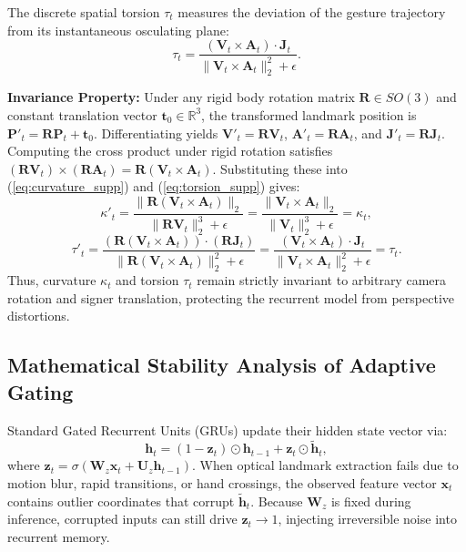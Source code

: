 \documentclass[10pt,conference]{IEEEtran}
\begin{document}
The discrete spatial torsion $\tau_t$ measures the deviation of the gesture trajectory from its instantaneous osculating plane:
\begin{equation}
\tau_t = \frac{(\mathbf{V}_t \times \mathbf{A}_t) \cdot \mathbf{J}_t}{\|\mathbf{V}_t \times \mathbf{A}_t\|_2^2 + \epsilon}.
\label{eq:torsion_supp}
\end{equation}

\textbf{Invariance Property:} Under any rigid body rotation matrix $\mathbf{R} \in SO(3)$ and constant translation vector $\mathbf{t}_0 \in \mathbb{R}^3$, the transformed landmark position is $\mathbf{P}'_t = \mathbf{R} \mathbf{P}_t + \mathbf{t}_0$. Differentiating yields $\mathbf{V}'_t = \mathbf{R} \mathbf{V}_t$, $\mathbf{A}'_t = \mathbf{R} \mathbf{A}_t$, and $\mathbf{J}'_t = \mathbf{R} \mathbf{J}_t$. Computing the cross product under rigid rotation satisfies $(\mathbf{R}\mathbf{V}_t) \times (\mathbf{R}\mathbf{A}_t) = \mathbf{R}(\mathbf{V}_t \times \mathbf{A}_t)$. Substituting these into (\ref{eq:curvature_supp}) and (\ref{eq:torsion_supp}) gives:
\begin{equation}
\kappa'_t = \frac{\|\mathbf{R}(\mathbf{V}_t \times \mathbf{A}_t)\|_2}{\|\mathbf{R}\mathbf{V}_t\|_2^3 + \epsilon} = \frac{\|\mathbf{V}_t \times \mathbf{A}_t\|_2}{\|\mathbf{V}_t\|_2^3 + \epsilon} = \kappa_t,
\end{equation}
\begin{equation}
\tau'_t = \frac{(\mathbf{R}(\mathbf{V}_t \times \mathbf{A}_t)) \cdot (\mathbf{R}\mathbf{J}_t)}{\|\mathbf{R}(\mathbf{V}_t \times \mathbf{A}_t)\|_2^2 + \epsilon} = \frac{(\mathbf{V}_t \times \mathbf{A}_t) \cdot \mathbf{J}_t}{\|\mathbf{V}_t \times \mathbf{A}_t\|_2^2 + \epsilon} = \tau_t.
\end{equation}
Thus, curvature $\kappa_t$ and torsion $\tau_t$ remain strictly invariant to arbitrary camera rotation and signer translation, protecting the recurrent model from perspective distortions.

\subsection{Mathematical Stability Analysis of Adaptive Gating}
Standard Gated Recurrent Units (GRUs) update their hidden state vector via:
\begin{equation}
\mathbf{h}_t = (1 - \mathbf{z}_t) \odot \mathbf{h}_{t-1} + \mathbf{z}_t \odot \tilde{\mathbf{h}}_t,
\end{equation}
where $\mathbf{z}_t = \sigma(\mathbf{W}_z \mathbf{x}_t + \mathbf{U}_z \mathbf{h}_{t-1})$. When optical landmark extraction fails due to motion blur, rapid transitions, or hand crossings, the observed feature vector $\mathbf{x}_t$ contains outlier coordinates that corrupt $\tilde{\mathbf{h}}_t$. Because $\mathbf{W}_z$ is fixed during inference, corrupted inputs can still drive $\mathbf{z}_t \to 1$, injecting irreversible noise into recurrent memory.
\end{document}
